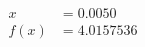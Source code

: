 \documentclass[preview]{standalone}
\begin{document}
\begin{align*}
x &= 0.0050\\f(x) &= 4.0157536
\end{align*}
\end{document}
